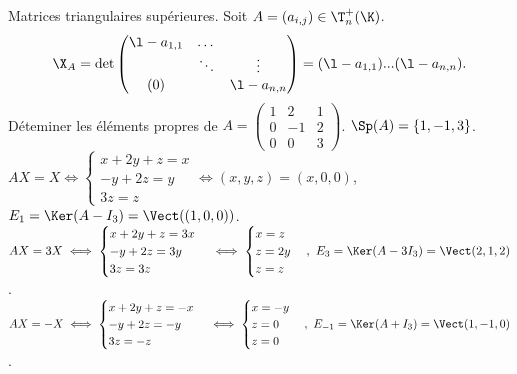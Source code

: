 \documentclass[11pt]{article}
\begin{document}
\begin{ex}{Matrices triangulaires supérieures.}{}
    Soit $A=(a_{i,j})\in \T_n^+(\K)$.
    \begin{equation*}
        \X_A = \det\begin{pmatrix}
            \l - a_{1,1} & \dots & \\
            & \ddots & \vdots \\
            (0) & & \l - a_{n,n}
        \end{pmatrix} = (\l-a_{1,1})...(\l-a_{n,n}).
    \end{equation*}
    Déteminer les éléments propres de $A=\begin{pmatrix}1&2&1\\0&-1&2\\0&0&3\end{pmatrix}$. $\Sp(A)=\{1,-1,3\}$.\\
    $AX=X\iff \begin{cases}x+2y+z=x\\-y+2z=y\\3z=z\end{cases}\iff (x,y,z)=(x,0,0)$, $E_1=\Ker(A-I_3)=\Vect((1,0,0))$.\\
    $AX=3X \iff \begin{cases} x+2y+z=3x\\-y+2z=3y\\3z=3z \end{cases} \iff \begin{cases} x=z\\ z=2y \\ z=z \end{cases}, ~ E_3=\Ker(A-3I_3)=\Vect(2,1,2)$.\\
    $AX=-X \iff \begin{cases}x+2y+z=-x \\ -y + 2z = -y \\ 3z = -z\end{cases} \iff \begin{cases}x=-y \\ z=0 \\ z=0\end{cases}, ~ E_{-1}=\Ker(A+I_3)=\Vect(1,-1,0)$.
\end{ex}
\end{document}
